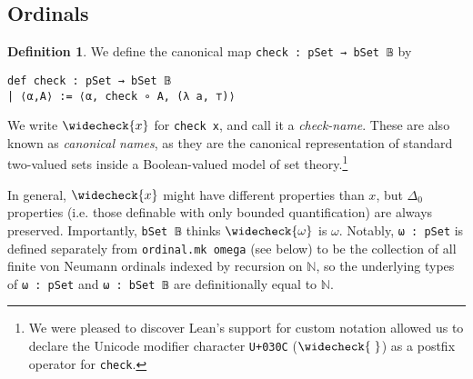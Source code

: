 \documentclass[sigplan,10pt,review, anonymous]{acmart}
\newcommand{\lil}{\lstinline}
\theoremstyle{definition}
\newtheorem{defn}{Definition}[section]
\begin{document}
\subsection{Ordinals}
\begin{defn}\label{def:check}
  We define the canonical map \lil{check : pSet → bSet 𝔹} by
  \begin{lstlisting}
def check : pSet → bSet 𝔹
| ⟨α,A⟩ := ⟨α, check ∘ A, (λ a, ⊤)⟩
  \end{lstlisting}
  We write $\widecheck{x}$ for \lil{check x}, and call it a \emph{check-name}.
  These are also known as \emph{canonical names}, as they are the canonical representation of standard two-valued sets inside a Boolean-valued model of set theory.\footnote{We were pleased to discover Lean's support for custom notation allowed us to declare the Unicode modifier character \texttt{U+030C} ($\widecheck{\hspace{1mm}}$) as a postfix operator for \texttt{check}.}
\end{defn}

In general, $\widecheck{x}$ might have different properties than $x$, but \(\Delta_0\) properties (i.e. those definable with only bounded quantification) are always preserved. Importantly, \lil{bSet 𝔹} thinks $\widecheck{\omega}$ is $\omega$. Notably, \lil{ω : pSet} is defined separately from \lil{ordinal.mk omega} (see below) to be the collection of all finite von Neumann ordinals indexed by recursion on $\mathbb{N}$, so the underlying types of \lil{ω : pSet} and \lil{ω : bSet 𝔹} are definitionally equal to \(\mathbb{N}\).
\end{document}
